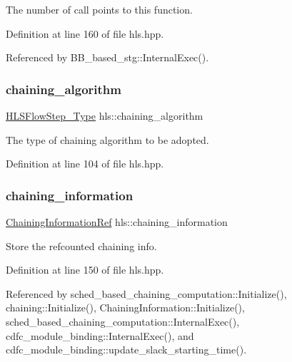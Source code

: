 The number of call points to this function. 



Definition at line 160 of file hls.\+hpp.



Referenced by B\+B\+\_\+based\+\_\+stg\+::\+Internal\+Exec().

\mbox{\label{classhls_aee1a6f122114edf0772f7026143f39f9}} 
\subsubsection{\texorpdfstring{chaining\+\_\+algorithm}{chaining\_algorithm}}
{\footnotesize\ttfamily \hyperlink{hls__step_8hpp_ada16bc22905016180e26fc7e39537f8d}{H\+L\+S\+Flow\+Step\+\_\+\+Type} hls\+::chaining\+\_\+algorithm}



The type of chaining algorithm to be adopted. 



Definition at line 104 of file hls.\+hpp.

\mbox{\label{classhls_a3928ee165cc11cc67e8e88689282dbb9}} 
\subsubsection{\texorpdfstring{chaining\+\_\+information}{chaining\_information}}
{\footnotesize\ttfamily \hyperlink{chaining__information_8hpp_ae1c1aca3d4b334cf7313b4c7fe6a283c}{Chaining\+Information\+Ref} hls\+::chaining\+\_\+information}



Store the refcounted chaining info. 



Definition at line 150 of file hls.\+hpp.



Referenced by sched\+\_\+based\+\_\+chaining\+\_\+computation\+::\+Initialize(), chaining\+::\+Initialize(), Chaining\+Information\+::\+Initialize(), sched\+\_\+based\+\_\+chaining\+\_\+computation\+::\+Internal\+Exec(), cdfc\+\_\+module\+\_\+binding\+::\+Internal\+Exec(), and cdfc\+\_\+module\+\_\+binding\+::update\+\_\+slack\+\_\+starting\+\_\+time().

